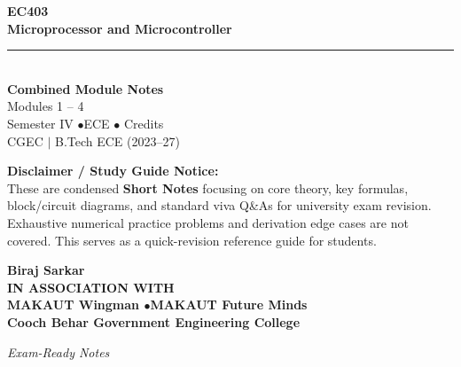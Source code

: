 \documentclass[12pt,a4paper]{article}
\begin{document}
\thispagestyle{empty}


\vspace*{1.0cm}
\begin{center}
  {\Huge\bfseries\color{myred} EC403}\\[10pt]
  {\LARGE\bfseries\color{mydark} Microprocessor and Microcontroller}\\[20pt]
  {\color{myred}\rule{0.7\linewidth}{1.5pt}}\\[18pt]
  {\Large\color{myteal}\textbf{Combined Module Notes}}\\[8pt]
  {\large\color{mydark} Modules 1 -- 4}\\[40pt]
  {\normalsize\color{mydark} Semester IV \quad$\bullet$\quad ECE \quad$\bullet$ Credits}\\[12pt]
  {\normalsize\color{mydark} CGEC \;$|$\; B.Tech ECE (2023--27)}
\end{center}
\vspace{1.0cm}
\begin{center}
  \begin{tcolorbox}[colback=mygray, colframe=mgframe, boxrule=0.5pt, arc=3pt, width=0.85\linewidth]
    \centering\small\color{mydark}
    \textbf{Disclaimer / Study Guide Notice:}\\
    These are condensed \textbf{Short Notes} focusing on core theory, key formulas, block/circuit diagrams, and standard viva Q\&As for university exam revision. Exhaustive numerical practice problems and derivation edge cases are not covered. This serves as a quick-revision reference guide for students.
  \end{tcolorbox}
\end{center}
\vfill
\vspace{0.6cm}
\begin{center}
  {\large\bfseries\color{mypurple} Biraj Sarkar}\\[16pt]
  {\footnotesize\color{watermark}\textbf{IN ASSOCIATION WITH}}\\[8pt]
  {\small\bfseries\color{mydark} MAKAUT Wingman \quad$\bullet$\quad MAKAUT Future Minds}\\[12pt]
  {\large\bfseries\color{myteal} Cooch Behar Government Engineering College}
\end{center}
\vfill
\begin{center}{\small\color{watermark}\textit{Exam-Ready Notes}}\end{center}
\clearpage
\end{document}
